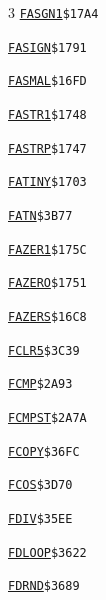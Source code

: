 \begin{multicols}{3}
\noindent\hyperlink{l:FASGN1}{\texttt{FASGN1}}\hfill\texttt{\$17A4~\phantom{000}\llap{\pageref{l:FASGN1}}}\par
\noindent\hyperlink{l:FASIGN}{\texttt{FASIGN}}\hfill\texttt{\$1791~\phantom{000}\llap{\pageref{l:FASIGN}}}\par
\noindent\hyperlink{l:FASMAL}{\texttt{FASMAL}}\hfill\texttt{\$16FD~\phantom{000}\llap{\pageref{l:FASMAL}}}\par
\noindent\hyperlink{l:FASTR1}{\texttt{FASTR1}}\hfill\texttt{\$1748~\phantom{000}\llap{\pageref{l:FASTR1}}}\par
\noindent\hyperlink{l:FASTRP}{\texttt{FASTRP}}\hfill\texttt{\$1747~\phantom{000}\llap{\pageref{l:FASTRP}}}\par
\noindent\hyperlink{l:FATINY}{\texttt{FATINY}}\hfill\texttt{\$1703~\phantom{000}\llap{\pageref{l:FATINY}}}\par
\noindent\hyperlink{l:FATN}{\texttt{FATN}}\hfill\texttt{\$3B77~\phantom{000}\llap{\pageref{l:FATN}}}\par
\noindent\hyperlink{l:FAZER1}{\texttt{FAZER1}}\hfill\texttt{\$175C~\phantom{000}\llap{\pageref{l:FAZER1}}}\par
\noindent\hyperlink{l:FAZERO}{\texttt{FAZERO}}\hfill\texttt{\$1751~\phantom{000}\llap{\pageref{l:FAZERO}}}\par
\noindent\hyperlink{l:FAZERS}{\texttt{FAZERS}}\hfill\texttt{\$16C8~\phantom{000}\llap{\pageref{l:FAZERS}}}\par
\noindent\hyperlink{l:FCLR5}{\texttt{FCLR5}}\hfill\texttt{\$3C39~\phantom{000}\llap{\pageref{l:FCLR5}}}\par
\noindent\hyperlink{l:FCMP}{\texttt{FCMP}}\hfill\texttt{\$2A93~\phantom{000}\llap{\pageref{l:FCMP}}}\par
\noindent\hyperlink{l:FCMPST}{\texttt{FCMPST}}\hfill\texttt{\$2A7A~\phantom{000}\llap{\pageref{l:FCMPST}}}\par
\noindent\hyperlink{l:FCOPY}{\texttt{FCOPY}}\hfill\texttt{\$36FC~\phantom{000}\llap{\pageref{l:FCOPY}}}\par
\noindent\hyperlink{l:FCOS}{\texttt{FCOS}}\hfill\texttt{\$3D70~\phantom{000}\llap{\pageref{l:FCOS}}}\par
\noindent\hyperlink{l:FDIV}{\texttt{FDIV}}\hfill\texttt{\$35EE~\phantom{000}\llap{\pageref{l:FDIV}}}\par
\noindent\hyperlink{l:FDLOOP}{\texttt{FDLOOP}}\hfill\texttt{\$3622~\phantom{000}\llap{\pageref{l:FDLOOP}}}\par
\noindent\hyperlink{l:FDRND}{\texttt{FDRND}}\hfill\texttt{\$3689~\phantom{000}\llap{\pageref{l:FDRND}}}\par

\end{multicols}
